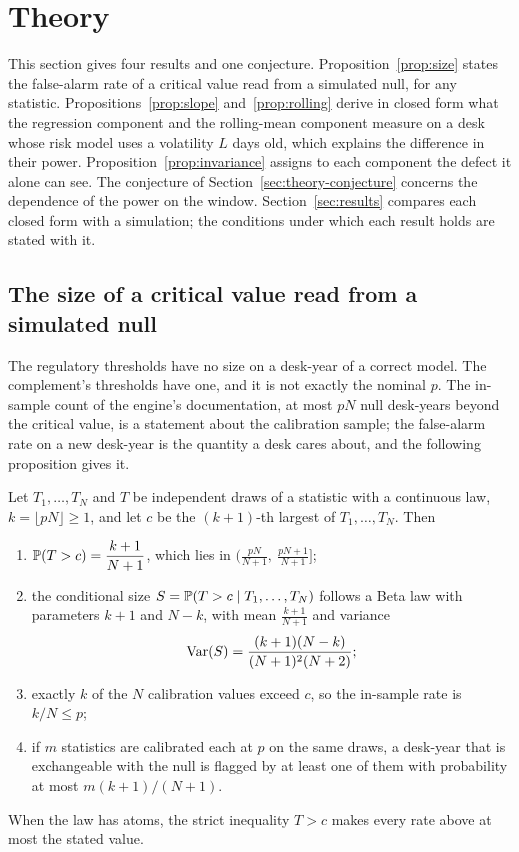 \section{Theory}
\label{sec:theory}

This section gives four results and one conjecture.
Proposition~\ref{prop:size} states the false-alarm rate of a critical value read from a simulated null, for any statistic.
Propositions~\ref{prop:slope} and~\ref{prop:rolling} derive in closed form what the regression component and the rolling-mean component measure on a desk whose risk model uses a volatility $L$ days old, which explains the difference in their power.
Proposition~\ref{prop:invariance} assigns to each component the defect it alone can see.
The conjecture of Section~\ref{sec:theory-conjecture} concerns the dependence of the power on the window.
Section~\ref{sec:results} compares each closed form with a simulation; the conditions under which each result holds are stated with it.

\subsection{The size of a critical value read from a simulated null}
\label{sec:theory-size}

The regulatory thresholds have no size on a desk-year of a correct model.
The complement's thresholds have one, and it is not exactly the nominal $p$.
The in-sample count of the engine's documentation, at most $pN$ null desk-years beyond the critical value, is a statement about the calibration sample; the false-alarm rate on a new desk-year is the quantity a desk cares about, and the following proposition gives it.

\begin{proposition}
\label{prop:size}
Let $T_1,\dots,T_N$ and $T$ be independent draws of a statistic with a continuous law, $k=\lfloor pN\rfloor\ge1$, and let $c$ be the $(k+1)$-th largest of $T_1,\dots,T_N$.
Then
\begin{enumerate}
\item[(a)] $\mathbb{P}(T>c)=\dfrac{k+1}{N+1}$, which lies in $\bigl(\tfrac{pN}{N+1},\ \tfrac{pN+1}{N+1}\bigr]$;
\item[(b)] the conditional size $S=\mathbb{P}(T>c\mid T_1,\dots,T_N)$ follows a Beta law with parameters $k+1$ and $N-k$, with mean $\tfrac{k+1}{N+1}$ and variance
\begin{equation}
\operatorname{Var}(S)=\frac{(k+1)(N-k)}{(N+1)^2(N+2)};
\label{eq:size-var}
\end{equation}
\item[(c)] exactly $k$ of the $N$ calibration values exceed $c$, so the in-sample rate is $k/N\le p$;
\item[(d)] if $m$ statistics are calibrated each at $p$ on the same draws, a desk-year that is exchangeable with the null is flagged by at least one of them with probability at most $m(k+1)/(N+1)$.
\end{enumerate}
When the law has atoms, the strict inequality $T>c$ makes every rate above at most the stated value.
\end{proposition}

